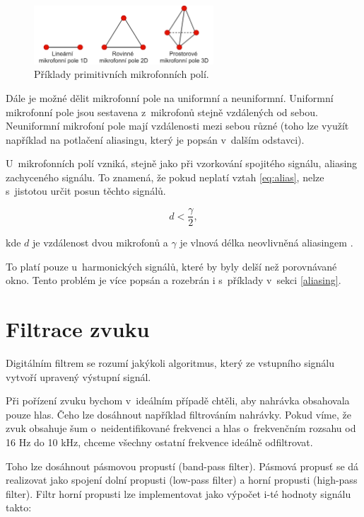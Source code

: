 \begin{figure}[hbt]
	\centering
	\includegraphics[width=0.6\textwidth]{obrazky-figures/mikrofonnipole.png}
	\caption{Příklady primitivních mikrofonních polí.}
	\label{pic:mikrofonni_pole}
\end{figure}

Dále je možné dělit mikrofonní pole na uniformní a neuniformní. Uniformní mikrofonní pole jsou sestavena z~mikrofonů stejně vzdálených od sebou. Neuniformní mikrofoní pole mají vzdálenosti mezi sebou různé (toho lze využít například na potlačení aliasingu, který je popsán v~dalším odstavci).

U~mikrofonních polí vzniká, stejně jako při vzorkování spojitého signálu, aliasing zachyceného signálu. To znamená, že pokud neplatí vztah \ref{eq:alias}, nelze s~jistotou určit posun těchto signálů.

\begin{equation}
	d<\frac{\gamma}{2},
	\label{eq:alias}
\end{equation}

kde $d$ je vzdálenost dvou mikrofonů a $\gamma$ je vlnová délka neovlivněná aliasingem \cite{aliasing}.

To platí pouze u~harmonických signálů, které by byly delší než porovnávané okno. Tento problém je více popsán a rozebrán i s~příklady v~sekci \ref{aliasing}.

\section{Filtrace zvuku}
\label{filt}

Digitálním filtrem se rozumí jakýkoli algoritmus, který ze vstupního signálu vytvoří upravený výstupní signál. 

Při pořízení zvuku bychom v~ideálním případě chtěli, aby nahrávka obsahovala pouze hlas. Čeho lze dosáhnout například filtrováním nahrávky. Pokud víme, že zvuk obsahuje šum o~neidentifikované frekvenci a hlas o~frekvenčním rozsahu od 16 Hz do 10 kHz, chceme všechny ostatní frekvence ideálně odfiltrovat. 

Toho lze dosáhnout pásmovou propustí (band-pass filter). Pásmová propusť se dá realizovat jako spojení dolní propusti (low-pass filter) a horní propusti (high-pass filter). Filtr horní propusti lze implementovat jako výpočet i-té hodnoty signálu takto:

